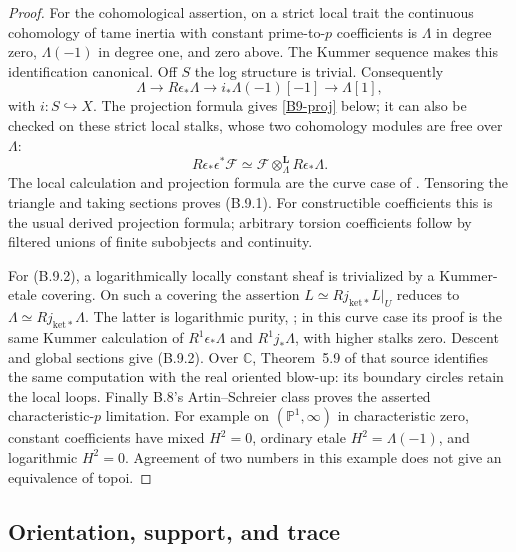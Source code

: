 \begin{proof}
For the cohomological assertion, on a strict local trait the
continuous cohomology of tame inertia with constant
prime-to-$p$ coefficients is $\Lambda$ in degree zero,
$\Lambda(-1)$ in degree one, and zero above. The Kummer
sequence makes this identification canonical. Off $S$ the
log structure is trivial. Consequently
\[
 \Lambda\longrightarrow R\epsilon_*\Lambda\longrightarrow
 i_*\Lambda(-1)[-1]\longrightarrow\Lambda[1],
\]
with $i:S\hookrightarrow X$. The projection formula gives
\eqref{B9-proj} below; it can also be checked on these strict
local stalks, whose two cohomology modules are free over
$\Lambda$:
\begin{equation}\label{B9-proj}
 R\epsilon_*\epsilon^*\mathcal F
     \simeq\mathcal F\otimes_\Lambda^{\mathbf L}R\epsilon_*\Lambda.
\end{equation}
The local calculation and projection formula are the
curve case of \citet[Theorem~5.2 and \S5.4]{Illusie2002}.
Tensoring the triangle and taking sections proves (B.9.1).
For constructible coefficients this is the usual derived
projection formula; arbitrary torsion coefficients follow
by filtered unions of finite subobjects and continuity.

For (B.9.2), a logarithmically locally constant sheaf is
trivialized by a Kummer-etale covering. On such a covering
the assertion $L\simeq Rj_{\mathrm{ket}*}L|_U$ reduces to
$\Lambda\simeq Rj_{\mathrm{ket}*}\Lambda$. The latter is
logarithmic purity, \citet[Theorem~7.4]{Illusie2002}; in this
curve case its proof is the same Kummer calculation of
$R^1\epsilon_*\Lambda$ and $R^1j_*\Lambda$, with higher
stalks zero. Descent and global sections give (B.9.2).
Over $\mathbb C$, Theorem~5.9 of that source identifies the
same computation with the real oriented blow-up: its
boundary circles retain the local loops. Finally B.8's
Artin--Schreier class proves the asserted characteristic-$p$
limitation. For example on $(\mathbb P^1,\infty)$ in
characteristic zero, constant coefficients have mixed
$H^2=0$, ordinary etale $H^2=\Lambda(-1)$, and logarithmic
$H^2=0$. Agreement of two numbers in this example does not
give an equivalence of topoi.
\end{proof}

\subsection{Orientation, support, and trace}

